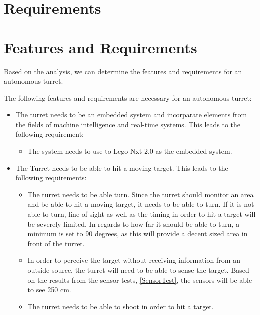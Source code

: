 \section{Requirements}


\section{Features and Requirements}

Based on the analysis, we can determine the features and requirements
for an autonomous turret.

The following features and requirements are necessary for an autonomous turret:
\begin{itemize}
  \item The turret needs to be an embedded system and incorparate elements from
  the fields of machine intelligence and real-time systems. This leads to the
  following requirement:
  \begin{itemize}
    \item The system needs to use to Lego Nxt 2.0 as the embedded
    system.
  \end{itemize}
  \item The Turret needs to be able to hit a moving target. This leads to the
  following requirements:
  \begin{itemize}
    \item The turret needs to be able turn. Since the turret should monitor an
    area and be able to hit a moving target, it needs to be able to turn. If it
    is not able to turn, line of sight as well as the timing in order to hit a
    target will be severely limited. In regards to how far it should be able to
    turn, a minimum is set to 90 degrees, as this will provide a decent sized
    area in front of the turret.
    \item In order to perceive the target without receiving information from an
    outside source, the turret will need to be able to sense the target. Based
    on the results from the sensor tests, \autoref{SensorTest}, the sensors will
    be able to see 250 cm.    
    \item The turret needs to be able to shoot in order to hit a
    target.
    

\end{itemize}
\end{itemize}
